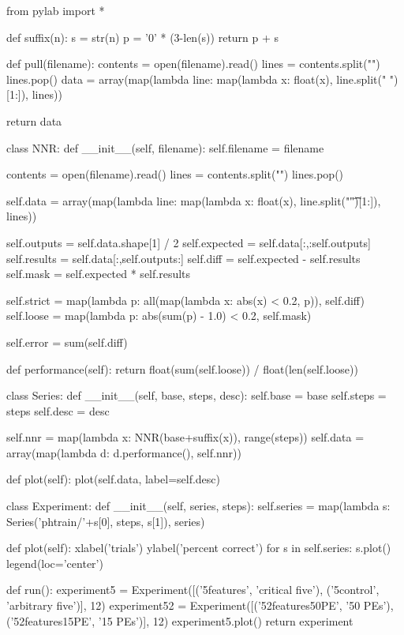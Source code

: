 \documentclass[12pt]{article}
\begin{document}
\begin{python}[]

from pylab import *

def suffix(n):
    s = str(n)
    p = '0' * (3-len(s))
    return p + s

def pull(filename):
    contents = open(filename).read()
    lines = contents.split("\n")
    lines.pop()
    data = array(map(lambda line: map(lambda x: 
        float(x), line.split(" ")[1:]), lines))

    return data

class NNR:
    def __init__(self, filename):
        self.filename = filename

        contents = open(filename).read()
        lines = contents.split("\n")
        lines.pop()

        self.data = array(map(lambda line: 
            map(lambda x: float(x), line.split("\t")[1:]), lines))

        self.outputs = self.data.shape[1] / 2
        self.expected = self.data[:,:self.outputs]
        self.results = self.data[:,self.outputs:]
        self.diff = self.expected - self.results
        self.mask = self.expected * self.results

        self.strict = map(lambda p: all(map(lambda x: 
            abs(x) < 0.2, p)), self.diff)
        self.loose = map(lambda p: abs(sum(p) - 1.0) < 0.2, self.mask)

        self.error = sum(self.diff)

    def performance(self):
        return float(sum(self.loose)) / float(len(self.loose))

class Series:
    def __init__(self, base, steps, desc):
        self.base = base
        self.steps = steps
        self.desc = desc

        self.nnr = map(lambda x: NNR(base+suffix(x)), range(steps))
        self.data = array(map(lambda d: d.performance(), self.nnr))

    def plot(self):
        plot(self.data, label=self.desc)

class Experiment:
    def __init__(self, series, steps):
        self.series = map(lambda s: 
            Series('phtrain/'+s[0], steps, s[1]), series)
        
    def plot(self):
        xlabel('trials')
        ylabel('percent correct')
        for s in self.series:
            s.plot()
        legend(loc='center')

def run():
    experiment5 = Experiment([('5features', 'critical five'), 
                              ('5control', 'arbitrary five')], 12)
    experiment52 = Experiment([('52features50PE', '50 PEs'), 
                               ('52features15PE', '15 PEs')], 12)
    experiment5.plot()
    return experiment

\end{python}
\end{document}

